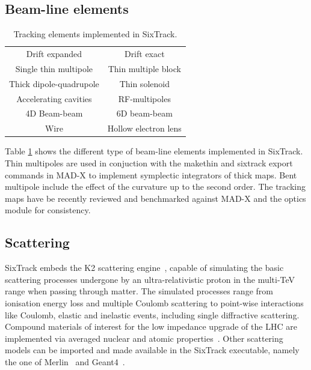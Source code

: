\documentclass[a4paper,
              ]{jacow}
\begin{document}
\subsection{Beam-line elements}

\begin{table}[ht]
    \centering
    \begin{tabular}{|c|c|}
        \hline
         Drift expanded & Drift exact \cite{fjellstrom13} \\
         Single thin multipole &  Thin multiple block \\
         Thick dipole-quadrupole & Thin solenoid \\
         Accelerating cavities &  RF-multipoles \cite{rf_multipoles}\\
         4D Beam-beam & 6D beam-beam \cite{beam_beam}\\
         Wire \cite{wire3} & Hollow electron lens \cite{elens,elens3}\\
         \hline
    \end{tabular}
    \caption{Tracking elements implemented in SixTrack.}
    \label{tab:tracking_elements}
\end{table}

Table \ref{tab:tracking_elements} shows the different type of beam-line elements implemented in SixTrack.
Thin multipoles are used in conjuction with the makethin and sixtrack export commands in MAD-X to implement symplectic integrators of thick maps.
Bent multipole include the effect of the curvature up to the second order.
The tracking maps have be recently reviewed and benchmarked against MAD-X and the optics module for consistency.

\subsection{Scattering}
SixTrack embeds the K2 scattering engine~\cite{K2,CTambascoThesis}, capable of simulating the basic scattering processes undergone by an ultra-relativistic proton in the multi-TeV range when passing through matter. The simulated processes range from ionisation energy loss and multiple Coulomb scattering to point-wise interactions like Coulomb, elastic and inelastic events, including single diffractive scattering.
Compound materials of interest for the low impedance upgrade of the LHC are implemented via averaged nuclear and atomic properties~\cite{EQuarantaThesis}.
Other scattering models can be imported and made available in the SixTrack executable, namely the one of Merlin~\cite{merlin} and Geant4~\cite{geant4, MolsonIPAC17}.
\end{document}
